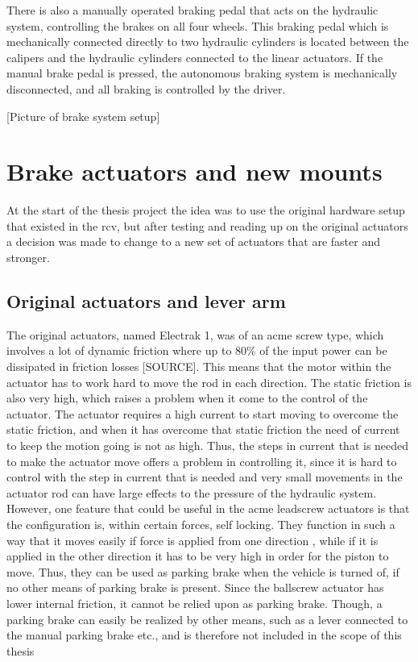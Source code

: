 \documentclass[a4paper,11pt]{kth-mag}
\begin{document}
There is also a manually operated braking pedal that acts on the hydraulic system, controlling the brakes on all four wheels. This braking pedal which is mechanically connected directly to two hydraulic cylinders is located between the calipers and the hydraulic cylinders connected to the linear actuators. If the manual brake pedal is pressed, the autonomous braking system is mechanically disconnected, and all braking is controlled by the driver. \newline

[Picture of brake system setup]

\section{Brake actuators and new mounts}
At the start of the thesis project the idea was to use the original hardware setup that existed in the \gls{rcv}, but after testing and reading up on the original actuators a decision was made to change to a new set of actuators that are faster and stronger. 

\subsection{Original actuators and lever arm}
The original actuators, named Electrak 1, was of an acme screw type, which involves a lot of dynamic friction where up to 80\% of the input power can be dissipated in friction losses [SOURCE]. This means that the motor within the actuator has to work hard to move the rod in each direction. The static friction is also very high, which raises a problem when it come to the control of the actuator. The actuator requires a high current to start moving to overcome the static friction, and when it has overcome that static friction the need of current to keep the motion going is not as high. Thus, the steps in current that is needed to make the actuator move offers a problem in controlling it, since it is hard to control with the step in current that is needed and very small movements in the actuator rod can have large effects to the pressure of the hydraulic system. \\

However, one feature that could be useful in the acme leadscrew actuators is that the configuration is, within certain forces, self locking. They function in such a way that it moves easily if force is applied from one direction , while if it is applied in the other direction it has to be very high in order for the piston to move. Thus, they can be used as parking brake when the vehicle is turned of, if no other means of parking brake is present. Since the ballscrew actuator has lower internal friction, it cannot be relied upon as parking brake. Though, a parking brake can easily be realized by other means, such as a lever  connected to the manual parking brake etc., and is therefore not included in the scope of this thesis\\
\end{document}
